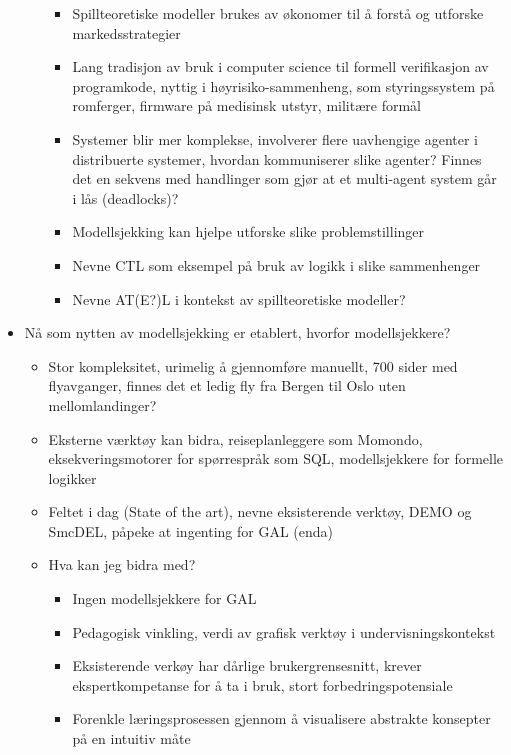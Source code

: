 \begin{itemize}
\begin{itemize}
		\begin{itemize}
			\item{Spillteoretiske modeller brukes av økonomer til å forstå og utforske markedsstrategier}
			\item{Lang tradisjon av bruk i computer science til formell verifikasjon av programkode, nyttig i høyrisiko-sammenheng, som styringssystem på romferger, firmware på medisinsk utstyr, militære formål}
			\item{Systemer blir mer komplekse, involverer flere uavhengige agenter i distribuerte systemer, hvordan kommuniserer slike agenter? Finnes det en sekvens med handlinger som gjør at et multi-agent system går i lås (deadlocks)?}
			\item{Modellsjekking kan hjelpe utforske slike problemstillinger}
			\item{Nevne CTL som eksempel på bruk av logikk i slike sammenhenger}
			\item{Nevne AT(E?)L i kontekst av spillteoretiske modeller?}
		\end{itemize}


	\end{itemize}

	\item{Nå som nytten av modellsjekking er etablert, hvorfor modellsjekkere?}

	\begin{itemize}
		\item{Stor kompleksitet, urimelig å gjennomføre manuellt, 700 sider med flyavganger, finnes det et ledig fly fra Bergen til Oslo uten mellomlandinger?}
		\item{Eksterne værktøy kan bidra, reiseplanleggere som Momondo, eksekveringsmotorer for spørrespråk som SQL, modellsjekkere for formelle logikker}
		\item{Feltet i dag (State of the art), nevne eksisterende verktøy, DEMO og SmcDEL, påpeke at ingenting for GAL (enda)}
		\item{Hva kan jeg bidra med?}
		\begin{itemize}
			\item{Ingen modellsjekkere for GAL}
			\item{Pedagogisk vinkling, verdi av grafisk verktøy i undervisningskontekst}
			\item{Eksisterende verkøy har dårlige brukergrensesnitt, krever ekspertkompetanse for å ta i bruk, stort forbedringspotensiale}
			\item{Forenkle læringsprosessen gjennom å visualisere abstrakte konsepter på en intuitiv måte}
		\end{itemize}
		
	\end{itemize}
	
\end{itemize}


